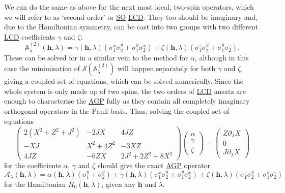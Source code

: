 \documentclass[a4paper,oneside,11pt]{book}
\newcommand{\hbb}{\boldsymbol{h}}
\newcommand{\sx}{\sigma^x}
\newcommand{\sy}{\sigma^y}
\newcommand{\sz}{\sigma^z}
\newcommand{\dlambda}{\partial_{\lambda}}
\newcommand{\AGP}[1]{\mathcal{A}_{#1}}
\newcommand{\approxAGP}{\mathbb{A}_{\lambda}}
\newcommand{\acrref}[1]{\hyperref[acr:#1]{#1}}
\begin{document}
We can do the same as above for the next most local, two-spin operators, which we will refer to as `second-order' or \acrref{SO} \acrref{LCD}. They too should be imaginary and, due to the Hamiltonian symmetry, can be cast into two groups with two different \acrref{LCD} coefficients $\gamma$ and $\zeta$:
\begin{equation}\label{eq:twospin_so_lcd}
        \approxAGP^{(2)}(\hbb, \lambda) = \gamma(\hbb, \lambda) (\sx_1 \sy_2 + \sy_1 \sx_2) + \zeta(\hbb, \lambda) (\sz_1 \sy_2 + \sy_1 \sz_2).
\end{equation}
These can be solved for in a similar vein to the method for $\alpha$, although in this case the minimisation of $\mathcal{S}(\approxAGP^{(2)})$ will happen separately for both $\gamma$ and $\zeta$, giving a coupled set of equations, which can be solved numerically. Since the whole system is only made up of two spins, the two orders of \acrref{LCD} ansatz are enough to characterise the \acrref{AGP} fully as they contain all completely imaginary orthogonal operators in the Pauli basis. Thus, solving the coupled set of equations
\begin{equation}\label{eq:two_spin_coupled_eqs}
        \begin{pmatrix}
        2(X^2 + Z^2 + J^2) & - 2JX & 4JZ \\ 
        -XJ & X^2 + 4Z^2 & -3XZ \\ 
        4JZ & -6ZX & 2J^2 + 2Z^2 + 8X^2
        \end{pmatrix} 
        \begin{pmatrix}
            \alpha \\
            \gamma \\
            \zeta
        \end{pmatrix} = 
        \begin{pmatrix}
            Z \dlambda X \\
            0 \\
            J \dlambda X
        \end{pmatrix}
\end{equation}
for the coefficients $\alpha$, $\gamma$ and $\zeta$ should give the exact \acrref{AGP} operator 
\begin{equation}\label{eq:two_spin_exact_AGP}
    \AGP{\lambda}(\hbb, \lambda) = \alpha(\hbb, \lambda) (\sy_1 + \sy_2) + \gamma(\hbb, \lambda) (\sx_1 \sy_2 + \sy_1 \sx_2) + \zeta(\hbb, \lambda) (\sz_1 \sy_2 + \sy_1 \sz_2)
\end{equation}
for the Hamiltonian $H_0(\hbb, \lambda)$, given any $\hbb$ and $\lambda$. 
\end{document}
